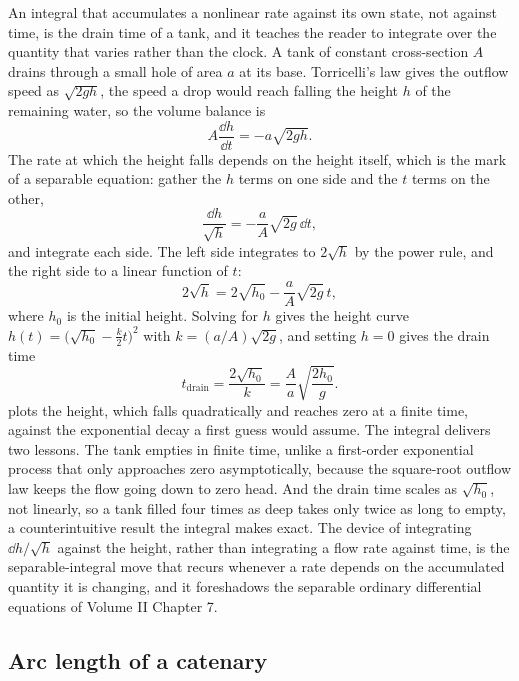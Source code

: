 An integral that accumulates a nonlinear rate against its own state, not
against time, is the drain time of a tank, and it teaches the reader to
integrate over the quantity that varies rather than the clock. A tank of
constant cross-section $A$ drains through a small hole of area $a$ at its
base. Torricelli's law gives the outflow speed as $\sqrt{2gh}$, the speed
a drop would reach falling the height $h$ of the remaining water, so the
volume balance is
\[
A\frac{\dd h}{\dd t} = -a\sqrt{2gh}.
\]
The rate at which the height falls depends on the height itself, which is
the mark of a separable equation: gather the $h$ terms on one side and the
$t$ terms on the other,
\[
\frac{\dd h}{\sqrt{h}} = -\frac{a}{A}\sqrt{2g}\,\dd t,
\]
and integrate each side. The left side integrates to $2\sqrt{h}$ by the
power rule, and the right side to a linear function of $t$:
\[
2\sqrt{h} = 2\sqrt{h_{0}} - \frac{a}{A}\sqrt{2g}\,t,
\]
where $h_{0}$ is the initial height. Solving for $h$ gives the height
curve $h(t) = \bigl(\sqrt{h_{0}} - \tfrac{k}{2}t\bigr)^{2}$ with $k =
(a/A)\sqrt{2g}$, and setting $h = 0$ gives the drain time
\[
t_{\mathrm{drain}} = \frac{2\sqrt{h_{0}}}{k} = \frac{A}{a}
\sqrt{\frac{2h_{0}}{g}}.
\]
 plots the height, which falls
quadratically and reaches zero at a finite time, against the exponential
decay a first guess would assume. The integral delivers two lessons. The
tank empties in finite time, unlike a first-order exponential process
that only approaches zero asymptotically, because the square-root outflow
law keeps the flow going down to zero head. And the drain time scales as
$\sqrt{h_{0}}$, not linearly, so a tank filled four times as deep takes
only twice as long to empty, a counterintuitive result the integral makes
exact. The device of integrating $\dd h/\sqrt{h}$ against the height,
rather than integrating a flow rate against time, is the separable-integral
move that recurs whenever a rate depends on the accumulated quantity it is
changing, and it foreshadows the separable ordinary differential equations
of Volume II Chapter 7.



\subsection{Arc length of a catenary}

